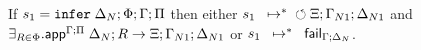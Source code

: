 \iffalse
\begin{theorem}[One rule]\label{thm:one_rule}
If $\transs{\dostate{\Delta}{\Phi}{\Gamma}{\Pi}}{\finalstate{\Xi}{\Gamma_{N1}}{\Delta_{N1}}}$
then $\exists_{R \in \Phi}$ such that
$\transs{\dostate{\Delta}{R}{\Gamma}{\Pi}}{\finalstate{\Xi}{\Gamma_{N1}}{\Delta_{N1}}}$
\end{theorem}
\begin{proof}
Induction on the size of $\Phi$.

Assume $\Phi = A \lolli B, \Phi'$ and $\rulestk = (\Delta; \Phi')$.
Apply two steps to the first state of the assumption to get
$\matstate{A \lolli B}{\rulestk}{\cdot}{\Gamma}{\Delta}{A}{\cdot
   \rightarrow \one}$.

Applying Lemma~\ref{thm:body_match} (LHS match result) leads to two subcases:

\begin{itemize}[leftmargin=*]
   \item Match fails: \\
   $\contstate{A \lolli B}{\rulestk}{\cdot}{\Gamma}$ \hfill (1) \\

   $\dostate{\Delta}{\Phi'}{\Gamma}{\Pi}$ \hfill (2) state after (1) \\
   $\transs{\dostate{\Delta}{R'}{\Gamma}{\Pi}}{\finalstate{\Xi}{\Gamma_{N1}}{\Delta_{N1}}}$
   \hfill (3) i.h. on (2) where $R' \in \Phi'$ \\

   \item Match succeeds: \\

   $\matstate{A \lolli B}{\rulestk}{\lstack{C}}{\Gamma}{\Delta_1}{\cdot}{\Delta'
      \rightarrow split(A)}$ \\ \hfill (1) \\
   $\mo \Gamma; \Delta; \cdot; A; B; \cdot; (\cdot, \Delta) \rightarrow \outsem$ \hfill (1)\\
   $\ao \Gamma; \Delta; A \lolli B; (\cdot, \Delta) \rightarrow \outsem$ \hfill (2) rule $\ao \m{rule}$ on (1) \\
   $\doo \Gamma; \Delta; A \lolli B \rightarrow \outsem$ \hfill (3) rule $\doo \m{rule}$ on (2) \\
\end{itemize}
\end{proof}
\fi


\begin{theorem}[Soundness]\label{thm:soundness}
If $s_1 = \mathtt{infer} \; \Delta_N; \Phi; \Gamma; \Pi$
then either $s_1 \;\; \mapsto^{*} \;\; \circlearrowleft \Xi ; \Gamma_{N1}; \Delta_{N1}$
and $\exists_{R \in \Phi}. \mathsf{app}^{\Gamma ; \Pi} \; \Delta_N ; R \rightarrow \Xi; \Gamma_{N1};
      \Delta_{N1}$
or $s_1 \;\; \mapsto^{*} \;\; \mathsf{fail}_{\Gamma; \Delta_N}$.
\end{theorem}

